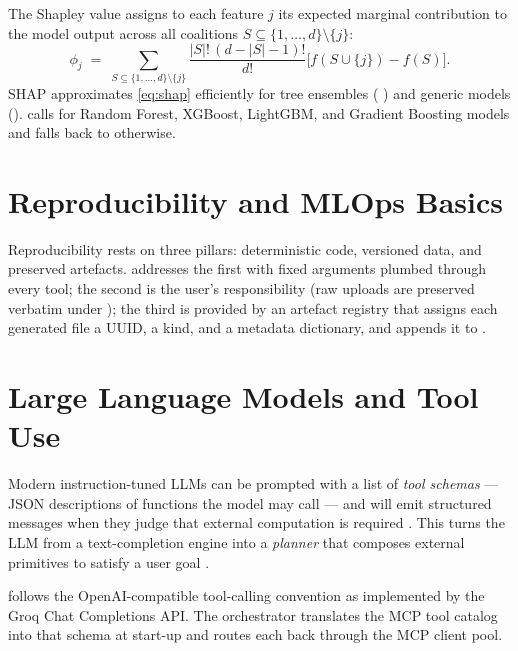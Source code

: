 The Shapley value assigns to each feature $j$ its expected marginal
contribution to the model output across all coalitions
$S\subseteq\{1,\ldots,d\}\setminus\{j\}$:
\begin{equation}
  \phi_j \;=\;
  \sum_{S\subseteq\{1,\ldots,d\}\setminus\{j\}}
  \frac{|S|!\,(d-|S|-1)!}{d!}
  \big[f(S\cup\{j\}) - f(S)\big].
  \label{eq:shap}
\end{equation}
SHAP \citep{lundberg2017shap} approximates
\eqref{eq:shap} efficiently for tree ensembles (
\citep{lundberg2020treeshap}) and generic models
(). \projname{} calls  for
Random Forest, XGBoost, LightGBM, and Gradient Boosting models and
falls back to  otherwise.

\section{Reproducibility and MLOps Basics}
\label{sec:mlops-bg}

Reproducibility \citep{pineau2021reproducibility} rests on three
pillars: deterministic code, versioned data, and preserved artefacts.
\projname{} addresses the first with fixed 
arguments plumbed through every tool; the second is the user's
responsibility (raw uploads are preserved verbatim under
); the third is provided by an artefact registry
that assigns each generated file a UUID, a kind, and a metadata
dictionary, and appends it to .

\section{Large Language Models and Tool Use}
\label{sec:tools-bg}

Modern instruction-tuned LLMs \citep{openai2023gpt4, llama3card,
touvron2023llama} can be prompted with a list of \emph{tool schemas}
--- JSON descriptions of functions the model may call --- and will
emit structured  messages when they judge that
external computation is required
\citep{openai2023function, schick2023toolformer}. This turns the LLM
from a text-completion engine into a \emph{planner} that composes
external primitives to satisfy a user goal
\citep{yao2023react, patil2023gorilla}.

\projname{} follows the OpenAI-compatible tool-calling convention as
implemented by the Groq Chat Completions API. The orchestrator
translates the MCP tool catalog into that schema at start-up and
routes each  back through the MCP client pool.

